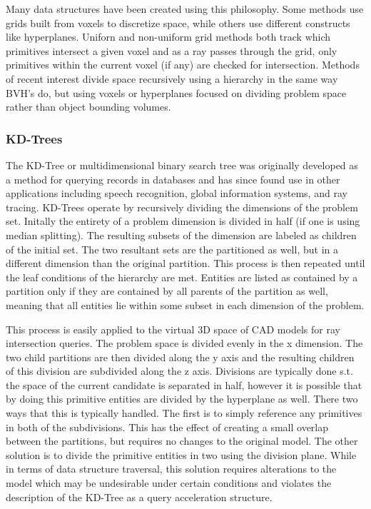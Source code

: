 \documentclass[10pt, a4paper]{article}
\begin{document}
Many data structures have been created using this philosophy. Some methods use grids built from voxels to discretize space, while others use different constructs like hyperplanes. Uniforn and non-uniform grid methods both track which primitives intersect a given voxel and as a ray passes through the grid, only primitives within the current voxel (if any) are checked for intersection. Methods of recent interest divide space recursively using a hierarchy in the same way BVH's do, but using voxels or hyperplanes focused on dividing problem space rather than object bounding volumes.


\subsubsection{KD-Trees}

The KD-Tree or multidimensional binary search tree was originally developed as a method for querying records in databases and has since found use in other applications including speech recognition, global information systems, and ray tracing. \cite{Bentley1975} KD-Trees operate by recursively dividing the dimensions of the problem set. Initally the entirety of a problem dimension is divided in half (if one is using median splitting). The resulting subsets of the dimension are labeled as children of the initial set. The two resultant sets are the partitioned as well, but in a different dimension than the original partition. This process is then repeated until the leaf conditions of the hierarchy are met. Entities are listed as contained by a partition only if they are contained by all parents of the partition as well, meaning that all entities lie within some subset in each dimension of the problem.

This process is easily applied to the virtual 3D space of CAD models for ray intersection queries. The problem space is divided evenly in the x dimension. The two child partitions are then divided along the y axis and the resulting children of this division are subdivided along the z axis. Divisions are typically done s.t. the space of the current candidate is separated in half, however it is possible that by doing this primitive entities are divided by the hyperplane as well. There two ways that this is typically handled. The first is to simply reference any primitives in both of the subdivisions. This has the effect of creating a small overlap between the partitions, but requires no changes to the original model. The other solution is to divide the primitive entities in two using the division plane. While in terms of data structure traversal, this solution requires alterations to the model which may be undesirable under certain conditions and violates the description of the KD-Tree as a query acceleration structure.
\end{document}
